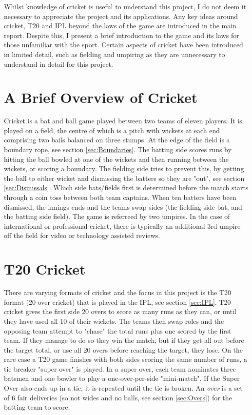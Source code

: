 \documentclass[12pt,a4paper]{report}
\theoremstyle{definition}
\begin{document}
Whilst knowledge of cricket is useful to understand this project, I do not deem it necessary to appreciate the project and its applications.
Any key ideas around cricket, T20 and IPL beyond the laws of the game are introduced in the main report.
Despite this, I present a brief introduction to the game and its laws for those unfamiliar with the sport.
Certain aspects of cricket have been introduced in limited detail, such as fielding and umpiring as they are unnecessary to understand in detail for this project.

\section{A Brief Overview of Cricket}

Cricket is a bat and ball game played between two teams of eleven players. 
It is played on a field, the centre of which is a pitch with wickets at each end comprising two bails balanced on three stumps. 
At the edge of the field is a boundary rope, see section \ref{sec:Boundaries}. 
The batting side scores runs by hitting the ball bowled at one of the wickets and then running between the wickets, or scoring a boundary.
The fielding side tries to prevent this, by getting the ball to either wicket and dismissing the batters so they are "out", see section \ref{sec:Dismissals}.
Which side bats/fields first is determined before the match starts through a coin toss between both team captains.
When ten batters have been dismissed, the innings ends and the teams swap sides (the fielding side bat, and the batting side field).
The game is referreed by two umpires.
In the case of international or professional cricket, there is typically an additional 3rd umpire off the field for video or technology assisted reviews.

\section{T20 Cricket} \label{sec:T20Cricket}

There are varying formats of cricket and the focus in this project is the T20 format (20 over cricket) that is played in the IPL, see section \ref{sec:IPL}. 
T20 cricket gives the first side 20 overs to score as many runs as they can, or until they have used all 10 of their wickets.
The teams then swap roles and the opposing team attempt to "chase" the total runs plus one scored by the first team. 
If they manage to do so they win the match, but if they get all out before the target total, or use all 20 overs before reaching the target, they lose.
On the rare case a T20 game finishes with both sides scoring the same number of runs, a tie breaker "super over" is played.
In a super over, each team nominates three batsmen and one bowler to play a one-over-per-side "mini-match".
If the Super Over also ends up in a tie, it is repeated until the tie is broken.
An \emph{over} is a set of 6 fair deliveries (so not wides and no balls, see section \ref{sec:Overs}) for the batting team to score.
\end{document}
